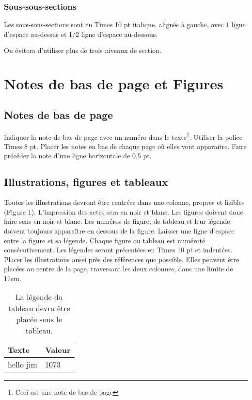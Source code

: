 \documentclass{article}
\begin{document}
\subsubsection{Sous-sous-sections}

Les sous-sous-sections sont en Times 10 pt italique, alignés à gauche, avec 1 ligne d'espace au-dessus et 1/2 ligne d'espace au-dessous.

On évitera d'utiliser plus de trois niveaux de section.


\section{Notes de bas de page et Figures}

\subsection{Notes de bas de page}

Indiquer la note de bas de page avec un numéro dans le texte\footnote{Ceci est une note de bas de page}.  Utiliser la police Times 8 pt. Placer les notes en bas de chaque page où elles vont apparaitre. Faire précéder la note d'une ligne horizontale de 0,5 pt.

\subsection{Illustrations, figures et tableaux}

Toutes les illustrations devront être centrées dans une colonne, propres et lisibles (Figure 1). L'impression des actes sera en noir et blanc. Les figures doivent donc faire sens en noir et blanc. Les numéros de figure, de tableau et leur légende doivent toujours apparaître en dessous de la figure. Laisser une ligne d'espace entre la figure et sa légende. Chaque figure ou tableau est numéroté consécutivement. Les légendes seront présentées en Times 10 pt et indentées. Placer les illustrations aussi près des références que possible. Elles peuvent être placées au centre de la page, traversant les deux colonnes, dans une limite de 17cm.

\begin{table}
\begin{center}
\begin{tabular}{|l|l|}
\hline
Texte & Valeur \\
\hline
hello jim  & 1073 \\
\hline
\end{tabular}
\end{center}
\caption{La légende du tableau devra être placée sous le tableau.}
\label{tab:example}
\end{table}
\end{document}
